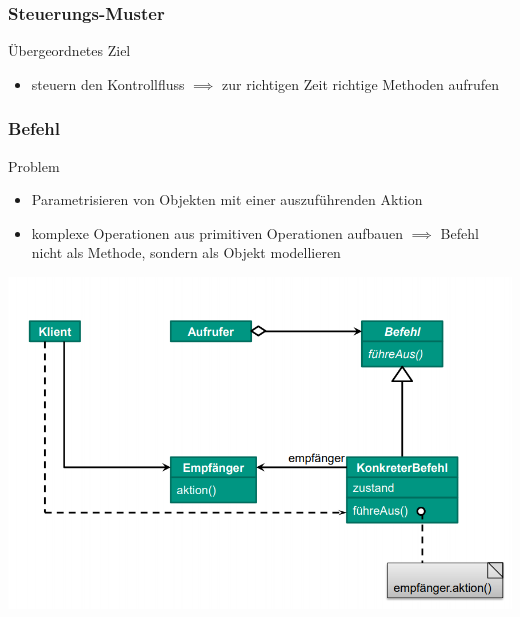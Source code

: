 \documentclass[18pt]{beamer}
\begin{document}
	\begin{frame}
		\frametitle{Steuerungs-Muster}
		\begin{block}{Übergeordnetes Ziel}
			\begin{itemize}
				\item steuern den Kontrollfluss \pause 
				\linebreak $\implies$ zur richtigen Zeit richtige Methoden aufrufen
			\end{itemize}
		\end{block}
	\end{frame}

	\begin{frame}
		\frametitle{Befehl}
		\begin{block}{Problem}
			\begin{itemize}
				\item Parametrisieren von Objekten mit einer auszuführenden Aktion \pause 
				\item komplexe Operationen aus primitiven Operationen aufbauen \pause
				\linebreak $\implies$ Befehl nicht als Methode, sondern als Objekt modellieren
			\end{itemize}
		\end{block}
		\pause
		\centering
		\includegraphics[scale=0.35]{./pics/tut4/command.png}
	\end{frame}
\end{document}

